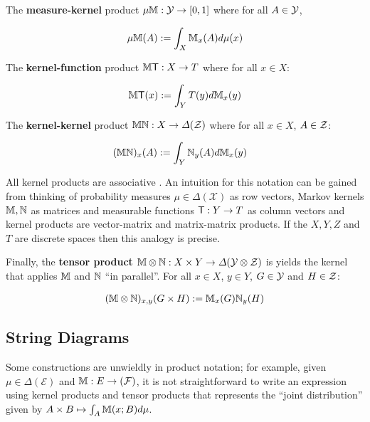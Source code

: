 The \textbf{measure-kernel} product $\mu \mathbb{M}:\mathcal{Y}\to [0,1]$ where for all $A\in\mathcal{Y}$,

\begin{align}
\mu\mathbb{M} (A) := \int_X \mathbb{M}_x (A) d\mu(x)
\end{align}

The \textbf{kernel-function} product $\mathbb{M} \mathsf{T}:X\to T$ where for all $x\in X$:

\begin{align}
\mathbb{M}\mathsf{T}(x) := \int_Y T(y) d\mathbb{M}_x(y)
\end{align}


The \textbf{kernel-kernel} product $\mathbb{M}\mathbb{N}:X\to \Delta(\mathcal{Z})$ where for all $x\in X$, $A\in \mathcal{Z}$:

\begin{align}
(\mathbb{M}\mathbb{N})_x(A) &:= \int_Y \mathbb{N}_y(A) d\mathbb{M}_x(y)
 \end{align} 

All kernel products are associative \citep{cinlar_probability_2011}. An intuition for this notation can be gained from thinking of probability measures $\mu\in \Delta(\mathcal{X})$ as row vectors, Markov kernels $\mathbb{M},\mathbb{N}$ as matrices and measurable functions $\mathsf{T}:Y\to T$ as column vectors and kernel products are vector-matrix and matrix-matrix products. If the $X,Y,Z$ and $T$ are discrete spaces then this analogy is precise.

Finally, the \textbf{tensor product} $\mathbb{M}\otimes \mathbb{N}:X\times Y\to \Delta(\mathcal{Y}\otimes\mathcal{Z})$ is yields the kernel that applies $\mathbb{M}$ and $\mathbb{N}$ ``in parallel''. For all $x\in X$, $y\in Y$, $G\in \mathcal{Y}$ and $H\in \mathcal{Z}$:

\begin{align}
(\mathbb{M}\otimes \mathbb{N})_{x,y}(G\times H) := \mathbb{M}_x(G)\mathbb{N}_y(H)
\end{align}

\subsection{String Diagrams}\label{ssec:mken_diagrams}

Some constructions are unwieldly in product notation; for example, given $\mu\in \Delta(\mathcal{E})$ and $\mathbb{M}:E\to (\mathcal{F})$, it is not straightforward to write an expression using kernel products and tensor products that represents the ``joint distribution'' given by $A\times B\mapsto \int_A \mathbb{M}(x;B)d\mu$.

